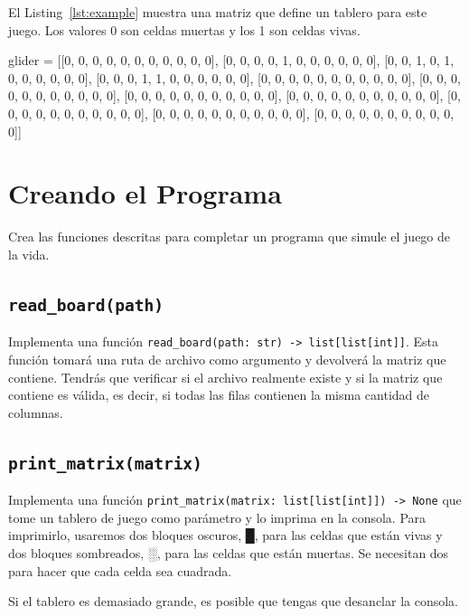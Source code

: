 \documentclass[10pt,a4paper]{article}
\begin{document}
El Listing~\ref{lst:example} muestra una matriz que define un tablero para este juego. Los valores 0 son celdas muertas y los 1 son celdas vivas.

\begin{attachedlisting}[caption={Ejemplo de tablero de juego.}, label=lst:example][matrix.py]
glider = [[0, 0, 0, 0, 0, 0, 0, 0, 0, 0, 0],
          [0, 0, 0, 0, 1, 0, 0, 0, 0, 0, 0],
          [0, 0, 1, 0, 1, 0, 0, 0, 0, 0, 0],
          [0, 0, 0, 1, 1, 0, 0, 0, 0, 0, 0],
          [0, 0, 0, 0, 0, 0, 0, 0, 0, 0, 0],
          [0, 0, 0, 0, 0, 0, 0, 0, 0, 0, 0],
          [0, 0, 0, 0, 0, 0, 0, 0, 0, 0, 0],
          [0, 0, 0, 0, 0, 0, 0, 0, 0, 0, 0],
          [0, 0, 0, 0, 0, 0, 0, 0, 0, 0, 0],
          [0, 0, 0, 0, 0, 0, 0, 0, 0, 0, 0],
          [0, 0, 0, 0, 0, 0, 0, 0, 0, 0, 0]]
\end{attachedlisting}

\newpage
\section{Creando el Programa}

Crea las funciones descritas para completar un programa que simule el juego de la vida.

\subsection{\texttt{read\_board(path)}}

Implementa una función \lstinline|read_board(path: str) -> list[list[int]]|. Esta función tomará una ruta de archivo como argumento y devolverá la matriz que contiene. Tendrás que verificar si el archivo realmente existe y si la matriz que contiene es válida, es decir, si todas las filas contienen la misma cantidad de columnas.

\subsection{\texttt{print\_matrix(matrix)}}

Implementa una función \lstinline|print_matrix(matrix: list[list[int]]) -> None| que tome un tablero de juego como parámetro y lo imprima en la consola. Para imprimirlo, usaremos dos bloques oscuros, █, para las celdas que están vivas y dos bloques sombreados, ░, para las celdas que están muertas. Se necesitan dos para hacer que cada celda sea cuadrada.

Si el tablero es demasiado grande, es posible que tengas que desanclar la consola.
\end{document}
